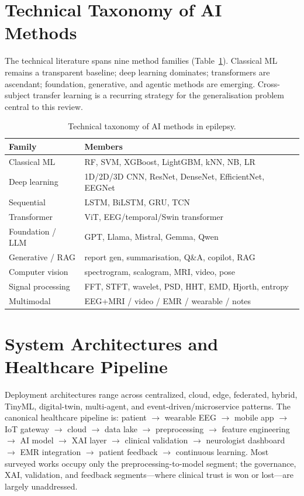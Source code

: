 \section{Technical Taxonomy of AI Methods}
The technical literature spans nine method families (Table~\ref{tab:tech}). Classical ML \citep{shah22,alharthi22,zhao23,ijaz24} remains a transparent baseline; deep learning \citep{tawhid22,zhang22,das24,dong24,darankoum24} dominates; transformers \citep{ke22,rukhsar23,ru24,wu22,potter23,chen24} are ascendant; foundation, generative, and agentic methods are emerging. Cross-subject transfer learning \citep{zhang20} is a recurring strategy for the generalisation problem central to this review.
\begin{table}[t]\centering\caption{Technical taxonomy of AI methods in epilepsy.}\label{tab:tech}
\footnotesize\begin{tabular}{ll}\toprule
Family & Members\\\midrule
Classical ML & RF, SVM, XGBoost, LightGBM, kNN, NB, LR\\
Deep learning & 1D/2D/3D CNN, ResNet, DenseNet, EfficientNet, EEGNet\\
Sequential & LSTM, BiLSTM, GRU, TCN\\
Transformer & ViT, EEG/temporal/Swin transformer\\
Foundation / LLM & GPT, Llama, Mistral, Gemma, Qwen\\
Generative / RAG & report gen, summarisation, Q\&A, copilot, RAG\\
Computer vision & spectrogram, scalogram, MRI, video, pose\\
Signal processing & FFT, STFT, wavelet, PSD, HHT, EMD, Hjorth, entropy\\
Multimodal & EEG+MRI / video / EMR / wearable / notes\\\bottomrule
\end{tabular}\end{table}

\section{System Architectures and Healthcare Pipeline}
Deployment architectures range across centralized, cloud, edge, federated, hybrid, TinyML, digital-twin, multi-agent, and event-driven/microservice patterns. The canonical healthcare pipeline is: patient $\rightarrow$ wearable EEG $\rightarrow$ mobile app $\rightarrow$ IoT gateway $\rightarrow$ cloud $\rightarrow$ data lake $\rightarrow$ preprocessing $\rightarrow$ feature engineering $\rightarrow$ AI model $\rightarrow$ XAI layer $\rightarrow$ clinical validation $\rightarrow$ neurologist dashboard $\rightarrow$ EMR integration $\rightarrow$ patient feedback $\rightarrow$ continuous learning. Most surveyed works occupy only the preprocessing-to-model segment; the governance, XAI, validation, and feedback segments---where clinical trust is won or lost---are largely unaddressed.

